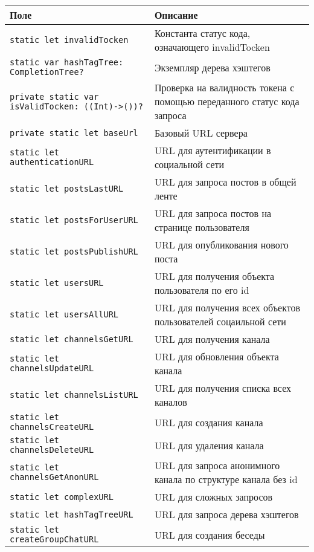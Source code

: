 \begin{longtable}{| >{\raggedright\arraybackslash}p{} | p{}|}
\hline
\textbf{Поле} & \textbf{Описание} \\ \hline
\texttt{static let invalidTocken } & {Константа статус кода, означающего invalidTocken} \\ \hline
\texttt{static var hashTagTree: CompletionTree?} & {Экземпляр дерева хэштегов} \\ \hline
\texttt{private static var isValidTocken: ((Int)->())? } & {Проверка на валидность токена с помощью переданного статус кода запроса} \\ \hline
\texttt{private static let baseUrl } & {Базовый URL сервера} \\ \hline
\texttt{static let authenticationURL } & {URL для аутентификации в социальной сети} \\ \hline
\texttt{static let postsLastURL } & {URL для запроса постов в общей ленте} \\ \hline
\texttt{static let postsForUserURL } & {URL для запроса постов на странице пользователя} \\ \hline
\texttt{static let postsPublishURL } & {URL для опубликования нового поста} \\ \hline
\texttt{static let usersURL } & {URL для получения объекта пользователя по его id} \\ \hline
\texttt{static let usersAllURL } & {URL для получения всех объектов пользователей соцаильной сети} \\ \hline
\texttt{static let channelsGetURL } & {URL для получения канала} \\ \hline
\texttt{static let channelsUpdateURL } & {URL для обновления объекта канала} \\ \hline
\texttt{static let channelsListURL } & {URL для получения списка всех каналов} \\ \hline
\texttt{static let channelsCreateURL } & {URL для создания канала} \\ \hline
\texttt{static let channelsDeleteURL } & {URL для удаления канала} \\ \hline
\texttt{static let channelsGetAnonURL } & {URL для запроса анонимного канала по структуре канала без id} \\ \hline
\texttt{static let complexURL } & {URL для сложных запросов} \\ \hline
\texttt{static let hashTagTreeURL } & {URL для запроса дерева хэштегов} \\ \hline
\texttt{static let createGroupChatURL } & {URL для создания беседы} \\ \hline

\end{longtable}
